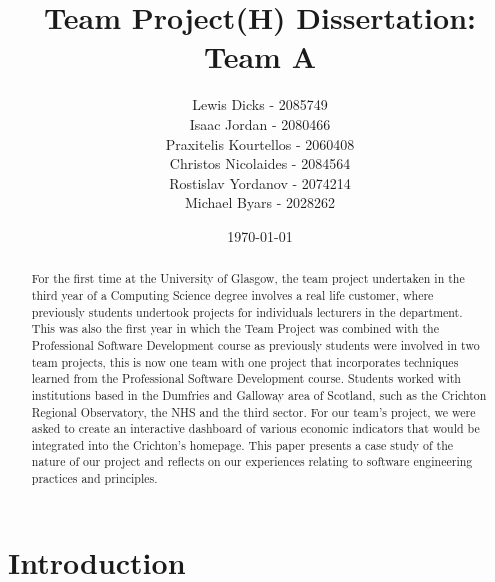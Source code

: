 \documentclass{l3proj}
\begin{document}
\title{Team Project(H) Dissertation: Team A}

\author{Lewis Dicks - 2085749 \\
        Isaac Jordan - 2080466 \\
        Praxitelis Kourtellos - 2060408 \\
        Christos Nicolaides - 2084564  \\
        Rostislav Yordanov - 2074214 \\
        Michael Byars - 2028262}

\date{\today}

\maketitle

\begin{abstract}

For the first time at the University of Glasgow, the team project undertaken in the third year of a Computing Science
degree involves a real life customer, where previously students undertook projects for individuals lecturers in the
department. This was also the first year in which the Team Project was combined with the Professional Software
Development course as previously students were involved in two team projects, this is now one team with one project that
incorporates techniques learned from the Professional Software Development course. Students worked with institutions
based in the Dumfries and Galloway area of Scotland, such as the Crichton Regional Observatory, the NHS and the third
sector. For our team's project, we were asked to create an interactive dashboard of various economic indicators that
would be integrated into the Crichton's homepage. This paper presents a case study of the nature of our project and
reflects on our experiences relating to software engineering practices and principles.

\end{abstract}

\educationalconsent

\newpage

\section{Introduction}
\end{document}
